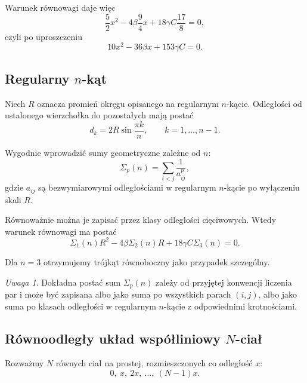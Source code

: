 \documentclass[11pt,a4paper]{article}
\theoremstyle{plain}
\theoremstyle{remark}
\newtheorem*{remark}{Uwaga}
\begin{document}
Warunek równowagi daje więc
\begin{equation}
\frac{5}{2}x^2 - 4\beta\frac{9}{4}x + 18\gamma C\frac{17}{8}=0,
\end{equation}
czyli po uproszczeniu
\begin{equation}
\boxed{10x^2 - 36\beta x + 153\gamma C = 0.}
\end{equation}

\subsection{Regularny \texorpdfstring{$n$}{n}-kąt}

Niech $R$ oznacza promień okręgu opisanego na regularnym $n$-kącie. Odległości od ustalonego wierzchołka do pozostałych mają postać
\begin{equation}
d_k = 2R\sin\frac{\pi k}{n},
\qquad k=1,\dots,n-1.
\end{equation}

Wygodnie wprowadzić sumy geometryczne zależne od $n$:
\begin{equation}
\Sigma_p(n) = \sum_{i<j}\frac{1}{a_{ij}^p},
\end{equation}
 gdzie $a_{ij}$ są bezwymiarowymi odległościami w regularnym $n$-kącie po wyłączeniu skali $R$.

Równoważnie można je zapisać przez klasy odległości cięciwowych. Wtedy warunek równowagi ma postać
\begin{equation}
\boxed{\Sigma_1(n)R^2 - 4\beta\Sigma_2(n)R + 18\gamma C\Sigma_3(n)=0.}
\end{equation}

Dla $n=3$ otrzymujemy trójkąt równoboczny jako przypadek szczególny.

\begin{remark}
Dokładna postać sum $\Sigma_p(n)$ zależy od przyjętej konwencji liczenia par i może być zapisana albo jako suma po wszystkich parach $(i,j)$, albo jako suma po klasach odległości w regularnym $n$-kącie z odpowiednimi krotnościami.
\end{remark}

\subsection{Równoodległy układ współliniowy \texorpdfstring{$N$}{N}-ciał}

Rozważmy $N$ równych ciał na prostej, rozmieszczonych co odległość $x$:
\begin{equation}
0,\ x,\ 2x,\ \dots,\ (N-1)x.
\end{equation}
\end{document}
